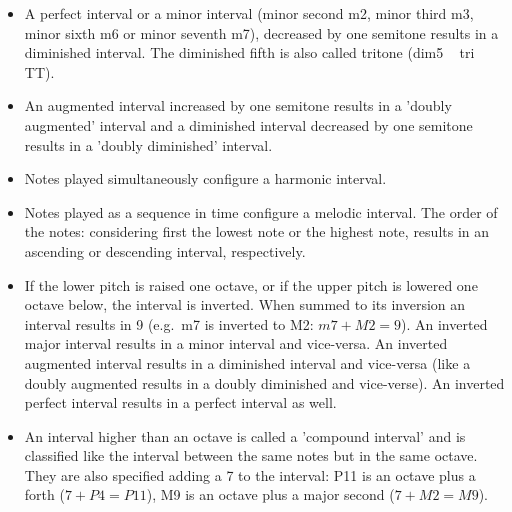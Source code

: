 \documentclass[
 aip,
 jmp,
 amsmath,amssymb,
 reprint,
]{revtex4-1}
\begin{document}
\begin{itemize}
                \item A perfect interval or a minor interval (minor second m2,
                minor third m3, minor sixth m6 or minor seventh m7), decreased
                by one semitone results in a diminished interval. The                       diminished fifth is also called tritone (dim5 ~ tri ~ TT).

                \item An augmented interval increased by one semitone results                 in a 'doubly augmented' interval and a diminished interval
                decreased by one semitone results in a 'doubly diminished'
                interval.

                \item Notes played simultaneously configure a harmonic
                interval.

                \item Notes played as a sequence in time configure a
                melodic interval. The order of the notes: considering first                 the lowest note or the highest note, results in an ascending                 or descending interval, respectively.

                \item If the lower pitch is raised one octave, or if
                the upper pitch is lowered one octave below, the interval is
                inverted. When summed to its inversion an interval results in                 9 (e.g.\ m7 is inverted to M2: $m7+M2=9$). An inverted major
                interval results in a minor interval and vice-versa. An                     inverted augmented interval results in a diminished interval                 and vice-versa (like a doubly augmented results in a doubly
                diminished and vice-verse). An inverted perfect interval                    results in a perfect interval as well.

                \item An interval higher than an octave is called a 'compound
                interval' and is classified like the interval between the same
                notes but in the same octave. They are also specified adding a                 7 to the interval: P11 is an octave plus a forth ($7 + P4 =                  P11$), M9 is an octave plus a major second ($7 + M2 = M9$).
\end{itemize}
\end{document}
